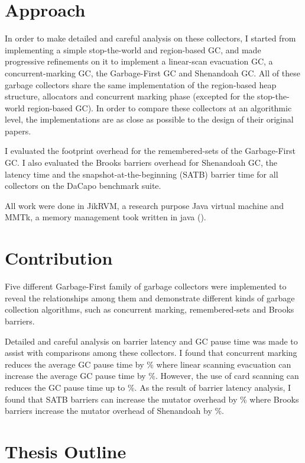 \section{Approach}

In order to make detailed and careful analysis on these collectors, I started
from implementing a simple stop-the-world and region-based GC, and made
progressive refinements on it to implement a linear-scan evacuation GC,
a concurrent-marking GC, the Garbage-First GC and Shenandoah GC.
All of these garbage collectors share the same implementation of the region-based
heap structure, allocators and concurrent marking phase
(excepted for the stop-the-world region-based GC).
In order to compare these collectors at an algorithmic level, the implementations
are as close as possible to the design of their original papers.

I evaluated the footprint overhead for the remembered-sets of the Garbage-First
GC. I also evaluated the Brooks barriers overhead for Shenandoah GC, the latency
time and the snapshot-at-the-beginning (SATB) barrier time for all collectors
on the DaCapo benchmark suite.

All work were done in JikRVM, a research purpose Java virtual machine and MMTk,
a memory management took written in java (\cite{blackburn2004oil}).

\section{Contribution}

Five different Garbage-First family of garbage collectors were implemented to reveal
the relationships among them and demonstrate different kinds of garbage collection
algorithms, such as concurrent marking, remembered-sets and Brooks barriers.

Detailed and careful analysis on barrier latency and GC pause time was made to
assist with comparisons among these collectors.
I found that concurrent marking reduces the average GC pause time by \%
where linear scanning evacuation can increase the average GC pause time by \%.
However, the use of card scanning can reduces the GC pause time up to \%.
As the result of barrier latency analysis, I found that SATB barriers can
increase the mutator overhead by \% where Brooks barriers
increase the mutator overhead of Shenandoah by \%.

\section{Thesis Outline}

